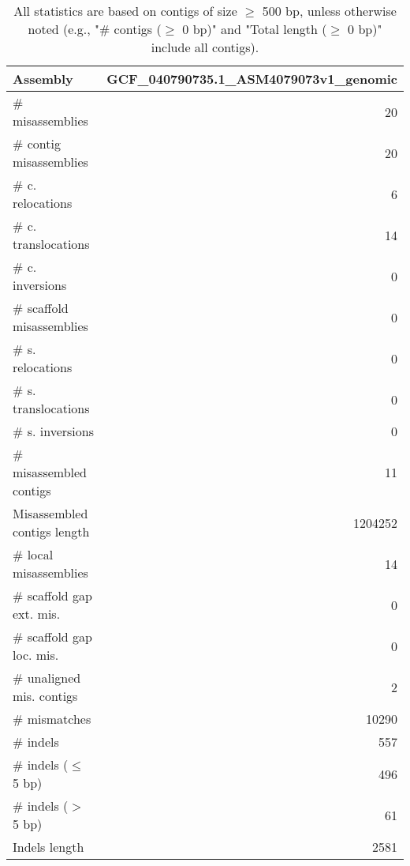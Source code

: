 \documentclass[12pt,a4paper]{article}
\begin{document}
\begin{table}[ht]
\begin{center}
\caption{All statistics are based on contigs of size $\geq$ 500 bp, unless otherwise noted (e.g., "\# contigs ($\geq$ 0 bp)" and "Total length ($\geq$ 0 bp)" include all contigs).}
\begin{tabular}{|l*{1}{|r}|}
\hline
Assembly & GCF\_040790735.1\_ASM4079073v1\_genomic \\ \hline
\# misassemblies & 20 \\ \hline
\hspace{2mm}\# contig misassemblies & 20 \\ \hline
\hspace{5mm}\# c. relocations & 6 \\ \hline
\hspace{5mm}\# c. translocations & 14 \\ \hline
\hspace{5mm}\# c. inversions & 0 \\ \hline
\hspace{2mm}\# scaffold misassemblies & 0 \\ \hline
\hspace{5mm}\# s. relocations & 0 \\ \hline
\hspace{5mm}\# s. translocations & 0 \\ \hline
\hspace{5mm}\# s. inversions & 0 \\ \hline
\# misassembled contigs & 11 \\ \hline
Misassembled contigs length & 1204252 \\ \hline
\# local misassemblies & 14 \\ \hline
\# scaffold gap ext. mis. & 0 \\ \hline
\# scaffold gap loc. mis. & 0 \\ \hline
\# unaligned mis. contigs & 2 \\ \hline
\# mismatches & 10290 \\ \hline
\# indels & 557 \\ \hline
\hspace{5mm}\# indels ($\leq$ 5 bp) & 496 \\ \hline
\hspace{5mm}\# indels ($>$ 5 bp) & 61 \\ \hline
Indels length & 2581 \\ \hline
\end{tabular}
\end{center}
\end{table}
\end{document}
